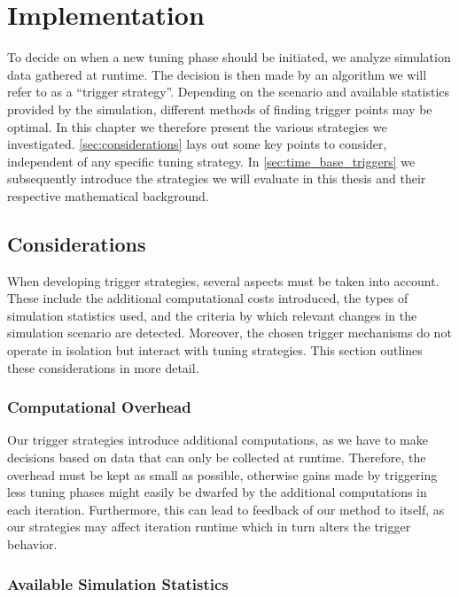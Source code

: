 \chapter[Implementation]{Implementation}
\label{cp:implementation}

{
	\parindent0pt
	To decide on when a new tuning phase should be initiated, we analyze simulation data gathered at runtime. The decision is then made by an algorithm we will refer to as a \enquote{trigger strategy}. Depending on the scenario and available statistics provided by the simulation, different methods of finding trigger points may be optimal. In this chapter we therefore present the various strategies we investigated. \autoref{sec:considerations} lays out some key points to consider, independent of any specific tuning strategy. In \autoref{sec:time_base_triggers} we subsequently introduce the strategies we will evaluate in this thesis and their respective mathematical background.
}

\section{Considerations}
\label{sec:considerations}
When developing trigger strategies, several aspects must be taken into account. These include the additional computational costs introduced, the types of simulation statistics used, and the criteria by which relevant changes in the simulation scenario are detected. Moreover, the chosen trigger mechanisms do not operate in isolation but interact with tuning strategies. This section outlines these considerations in more detail.

\subsection{Computational Overhead}
Our trigger strategies introduce additional computations, as we have to make decisions based on data that can only be collected at runtime. Therefore, the overhead must be kept as small as possible, otherwise gains made by triggering less tuning phases might easily be dwarfed by the additional computations in each iteration. Furthermore, this can lead to feedback of our method to itself, as our strategies may affect iteration runtime which in turn alters the trigger behavior.

\subsection{Available Simulation Statistics}
\label{sec:avail_sim_stats}

